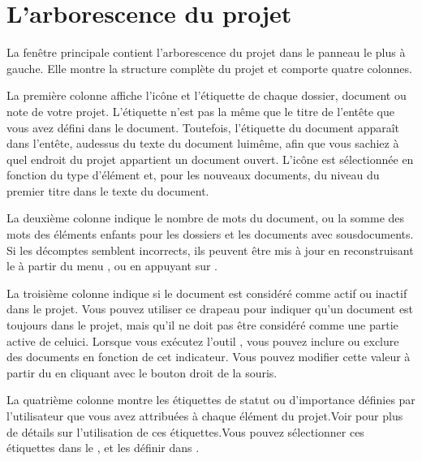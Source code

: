 \documentclass[a4paper,11pt,french]{sphinxmanual}
\begin{document}
\section{L’arborescence du projet}
\label{\detokenize{usage_project:the-project-tree}}\label{\detokenize{usage_project:a-ui-tree}}
\sphinxAtStartPar
La fenêtre principale contient l’arborescence du projet dans le panneau le plus à gauche. Elle montre la structure complète du projet et comporte quatre colonnes.
\begin{description}
\sphinxAtStartPar
La première colonne affiche l’icône et l’étiquette de chaque dossier, document ou note de votre projet. L’étiquette n’est pas la même que le titre de l’en\sphinxhyphen{}tête que vous avez défini dans le document. Toutefois, l’étiquette du document apparaît dans l’en\sphinxhyphen{}tête, au\sphinxhyphen{}dessus du texte du document lui\sphinxhyphen{}même, afin que vous sachiez à quel endroit du projet appartient un document ouvert. L’icône est sélectionnée en fonction du type d’élément et, pour les nouveaux documents, du niveau du premier titre dans le texte du document.

\sphinxAtStartPar
La deuxième colonne indique le nombre de mots du document, ou la somme des mots des éléments enfants pour les dossiers et les documents avec sous\sphinxhyphen{}documents. Si les décomptes semblent incorrects, ils peuvent être mis à jour en reconstruisant le {\hyperref[\detokenize{int_glossary:term-Project-Index}]{}} à partir du menu , ou en appuyant sur .

\sphinxAtStartPar
La troisième colonne indique si le document est considéré comme actif ou inactif dans le projet. Vous pouvez utiliser ce drapeau pour indiquer qu’un document est toujours dans le projet, mais qu’il ne doit pas être considéré comme une partie active de celui\sphinxhyphen{}ci. Lorsque vous exécutez l’outil , vous pouvez inclure ou exclure des documents en fonction de cet indicateur. Vous pouvez modifier cette valeur à partir du {\hyperref[\detokenize{int_glossary:term-Context-Menu}]{}} en cliquant avec le bouton droit de la souris.

\sphinxAtStartPar
La quatrième colonne montre les étiquettes de statut ou d’importance définies par l’utilisateur que vous avez attribuées à chaque élément du projet.Voir {\hyperref[\detokenize{usage_project:a-ui-tree-status}]{}} pour plus de détails sur l’utilisation de ces étiquettes.Vous pouvez sélectionner ces étiquettes dans le {\hyperref[\detokenize{int_glossary:term-Context-Menu}]{}}, et les définir dans .

\end{description}
\end{document}
